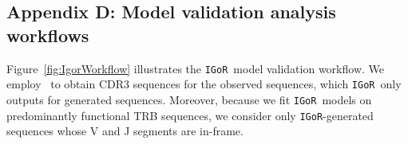 \documentclass{article}
\newcommand{\igor}{\texttt{IGoR}}
\newcommand{\igblast}{\text{IgBlast}}
\begin{document}
\subsection*{Appendix D: Model validation analysis workflows}
Figure~\ref{fig:IgorWorkflow} illustrates the \igor\ model validation workflow.
We employ \igblast\ to obtain CDR3 sequences for the observed sequences, which \igor\ only outputs for generated sequences.
Moreover, because we fit \igor\ models on predominantly functional TRB sequences, we consider only \igor-generated sequences whose V and J segments are in-frame.

\end{document}
